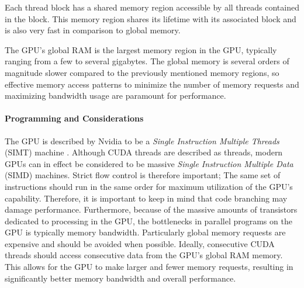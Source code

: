 Each thread block has a shared memory region accessible by all threads contained in the block.
This memory region shares its lifetime with its associated block and is also very fast in comparison to global memory.

The GPU's global RAM is the largest memory region in the GPU, typically ranging from a few to several gigabytes.
The global memory is several orders of magnitude slower compared to the previously mentioned memory regions, so effective memory access patterns to minimize the number of memory requests and maximizing bandwidth usage are paramount for performance.

\paragraph{Programming and Considerations}
The GPU is described by Nvidia to be a \textit{Single Instruction Multiple Threads} (SIMT) machine \cite{cuda}.
Although CUDA threads are described as threads, modern GPUs can in effect be considered to be massive \textit{Single Instruction Multiple Data} (SIMD) machines. 
Strict flow control is therefore important; 
The same set of instructions should run in the same order for maximum utilization of the GPU's capability.
Therefore, it is important to keep in mind that code branching may damage performance.
Furthermore, because of the massive amounts of transistors dedicated to processing in the GPU, the bottlenecks in parallel programs on the GPU is typically memory bandwidth.
Particularly global memory requests are expensive and should be avoided when possible.
Ideally, consecutive CUDA threads should access consecutive data from the GPU's global RAM memory.
This allows for the GPU to make larger and fewer memory requests, resulting in significantly better memory bandwidth and overall performance.
